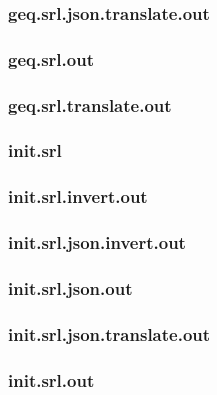 \subsubsection{geq.srl.json.translate.out}
\label{app:geq_srl.json.translate.out}

\subsubsection{geq.srl.out}
\label{app:geq_srl.out}

\subsubsection{geq.srl.translate.out}
\label{app:geq_srl.translate.out}

\subsubsection{init.srl}
\label{app:init_srl}

\subsubsection{init.srl.invert.out}
\label{app:init_srl.invert.out}

\subsubsection{init.srl.json.invert.out}
\label{app:init_srl.json.invert.out}

\subsubsection{init.srl.json.out}
\label{app:init_srl.json.out}

\subsubsection{init.srl.json.translate.out}
\label{app:init_srl.json.translate.out}

\subsubsection{init.srl.out}
\label{app:init_srl.out}

